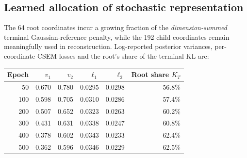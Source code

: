 \documentclass[10pt]{article}
\begin{document}
\subsection{Learned allocation of stochastic representation}
The 64 root coordinates incur a growing fraction of the \emph{dimension-summed} terminal Gaussian-reference penalty, while the 192 child coordinates remain meaningfully used in reconstruction. Log-reported posterior variances, per-coordinate CSEM losses and the root's share of the terminal KL are:
\begin{center}
\begin{tabular}{@{}rrrrrr@{}}
\toprule
Epoch & $v_1$ & $v_2$ & $\ell_1$ & $\ell_2$ & Root share $K_T$ \\
\midrule
50 & 0.670 & 0.780 & 0.0295 & 0.0298 & 56.8\% \\
100 & 0.598 & 0.705 & 0.0310 & 0.0286 & 57.4\% \\
200 & 0.507 & 0.652 & 0.0323 & 0.0263 & 60.2\% \\
300 & 0.431 & 0.631 & 0.0338 & 0.0247 & 60.8\% \\
400 & 0.378 & 0.602 & 0.0343 & 0.0233 & 62.4\% \\
500 & 0.362 & 0.596 & 0.0346 & 0.0229 & 62.5\% \\
\bottomrule
\end{tabular}
\end{center}
\end{document}

